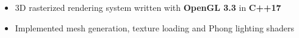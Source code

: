\documentclass{moderncv}
\begin{document}
{\begin{itemize}
    \item 3D rasterized rendering system written with \textbf{OpenGL 3.3} in \textbf{C++17}
    \item Implemented mesh generation, texture loading and Phong lighting shaders
\end{itemize}}

\begin{comment}
\cventry{Sep 2021 - Nov 2021}{Pipelined 32-Bit RISC-V Core}{}{Verilog | Verilator}{}
{\begin{itemize}
    \item Implemented RV32I spec in \textbf{Verilog} using a 5-stage pipeline design with register bypassing, simulated test programs (individual instructions and benchmark algorithms) using \textbf{Verilator} to verify design
\end{itemize}}
\end{comment}

\begin{comment}
\cventry{May 2021 - Sep 2021}{Real-Time Operating System Kernel}{}{C | ARM Assembly | Keil uVision}{}
{\begin{itemize}
    \item Implements custom memory manager, EDF scheduler, IPC, and interrupt-based I/O
    \item Targets \textbf{ARM Cortex-M3} processor, implemented context switching in assembly
    \item Allows user to run custom commands through \textbf{UART} terminal
\end{itemize}}
\end{comment}
\end{document}
